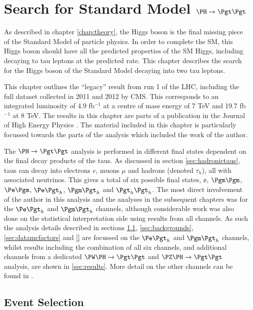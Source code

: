 \chapter{Search for Standard Model $\PH \to \Pgt\Pgt$}
\label{chap:httSM}

As described in chapter \ref{chap:theory}, the Higgs boson is the final missing 
piece of the Standard Model of particle physics. In order to complete the
\ac{SM}, this Higgs boson should have all the predicted properties of the
\ac{SM} Higgs, including decaying to tau leptons at the predicted rate. This
chapter describes the search for the Higgs boson of the Standard Model 
decaying into two tau leptons.

This chapter outlines the ``legacy'' result from run 1 of the \ac{LHC}, including the
full dataset collected in 2011 and 2012 by CMS. This corresponds to an
integrated luminosity of 4.9 fb$^{-1}$ at a centre of mass energy of 7 TeV and
19.7 fb$^{-1}$ at 8 TeV. The results in this chapter are parts of a publication 
in the Journal of High Energy Physics \cite{HIG-13-004}. The material included 
in this chapter is particularly focussed towards the parts of the analysis which 
included the work of the author. 

The $\PH \to \Pgt\Pgt$ analysis is performed in different final states dependent
on the final decay products of the taus. As discussed in section
\ref{sec:hadronictaus}, taus can decay into electrons $e$,
muons $\mu$ and hadrons (denoted $\tau_{h}$), all with associated neutrinos.
This gives a total of six possible final states, $\ee$, $\mumu$, $\emu$,
$\etau$, $\mutau$ and $\tautau$. The most direct involvement of the author in this
analysis and the analyses in the subsequent chapters was for the $\etau$ and
$\mutau$ channels, although considerable work was also done on the statistical
interpretation side using results from all channels. 
As such the analysis details described in sections \ref{sec:eventSelection},
\ref{sec:backgrounds}, \ref{sec:datamcfactors} and \ref{} are focussed on the
$\etau$ and $\mutau$ channels, whilst results including the combination of all
six channels, and additional channels from a dedicated $\PW\PH\to\Pgt\Pgt$ and
$\PZ\PH\to\Pgt\Pgt$ analysis, are shown in \ref{sec:results}. More detail on the other channels
can be found in \cite{HIG-13-004}. 

\section{Event Selection}
\label{sec:eventSelection}

